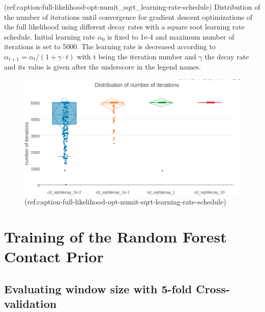 \documentclass[12pt,a4paper,twoside]{book}
\theoremstyle{definition}
\theoremstyle{definition}
\theoremstyle{remark}
\begin{document}
(ref:caption-full-likelihood-opt-numit\_sqrt\_learning-rate-schedule)
Distribution of the number of iterations until convergence for gradient
descent optimizations of the full likelihood using different decay rates
with a square root learning rate schedule. Initial learning rate
\(\alpha_0\) is fixed to 1e-4 and maximum number of iterations is set to
5000. The learning rate is decreased according to
\(\alpha_{t+1} = \alpha_{t} / (1 + \gamma \cdot t)\) with t being the
iteration number and \(\gamma\) the decay rate and its value is given
after the underscore in the legend names.

\begin{figure}

{\centering \includegraphics[width=0.9\linewidth]{img/full_likelihood/appendix/distribution_numiterations_against_alpha1e-4_sqrtdecay} 

}

\caption{(ref:caption-full-likelihood-opt-numit-sqrt-learning-rate-schedule)}\label{fig:full-likelihood-opt-numit-sqrt-learning-rate-schedule}
\end{figure}

\chapter{Training of the Random Forest Contact
Prior}\label{training-of-the-random-forest-contact-prior}

\section{Evaluating window size with 5-fold
Cross-validation}\label{rf-window-size}
\end{document}
